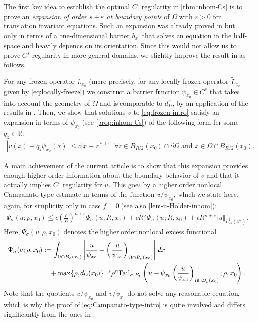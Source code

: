 \documentclass[11pt,reqno]{amsart}
\theoremstyle{plain}
\theoremstyle{definition}
\numberwithin{equation}{section}
\newcommand{\R}{\mathbb{R}}
\newcommand{\eps}{\varepsilon}
\newcommand{\1}{\mathbbm{1}}
\renewcommand{\d}{\textnormal{\,d}}
\begin{document}
The first key idea to establish the optimal $C^s$ regularity in \autoref{thm:inhom-Cs} is to prove an \textit{expansion of order $s+\eps$ at boundary points} of $\Omega$ with $\eps > 0$ for translation invariant equations.
Such an expansion was already proved in \cite{RoWe24} but only in terms of a one-dimensional barrier $b_{x_0}$ that solves an equation in the half-space and heavily depends on its orientation. Since this would not allow us to prove $C^s$ regularity in more general domains, we slightly improve the result in \cite{RoWe24} as follows.

For any frozen operator $L_{x_0}$ (more precisely, for any locally frozen operator $\widetilde{L}_{x_0}$ given by \eqref{eq:locally-freeze}) we construct a barrier function $\psi_{x_0} \in C^s$ that takes into account the geometry of $\Omega$ and is comparable to $d_{\Omega}^s$, by an application of the results in \cite{RoWe24}. Then, we show that solutions $v$ to \eqref{eq:frozen-intro} satisfy an expansion in terms of $\psi_{x_0}$ (see \autoref{prop:inhom-Cs}) of the following form for some $q_z \in \R$:
\begin{align*}
|v(x) - q_z \psi_{x_0}(x)| \le c |x-z|^{s+\eps} ~~ \forall z \in B_{R/2}(x_0) \cap \partial \Omega \text{ and } x \in \Omega \cap B_{R/2}(x_0).
\end{align*}

A main achievement of the current article is to show that this expansion provides enough higher order information about the boundary behavior of $v$ and that it actually implies $C^s$ regularity for $u$. This goes by a higher order nonlocal Campanato-type estimate in terms of the function $u/\psi_{x_0}$, which we state here, again, for simplicity only in case $f = 0$ (see also \autoref{lem-u-Holder-inhom}):
\begin{align}
\label{eq:Campanato-type-intro}
\Psi_{\sigma}(u;\rho,x_0) \leq c \left( \frac{\rho}{R} \right)^{n+\eps} \Psi_{\sigma}(u;R,x_0) + c R^{\sigma} \Phi_{\sigma}(u;R,x_0) + c R^{n + s } \Vert u \Vert_{L^1_{2s}(\R^n)}.
\end{align}
Here, $\Psi_{\sigma}(u;\rho,x_0)$ denotes the higher order nonlocal excess functional
\begin{align}\label{eq-excess-Psi}
\begin{split}
    \Psi_{\sigma}(u;\rho,x_0) &:= \int_{\Omega \cap B_{\rho}(x_0)} \left|\frac{u}{\psi_{x_0}} - \left( \frac{u}{\psi_{x_0}} \right)_{\Omega \cap B_{\rho}(x_0)} \right| \d x \\
    &\quad + \max \{ \rho,d_{\Omega}(x_0) \}^{-s} \rho^n \mathrm{Tail}_{\sigma,B_1}\left(u - \psi_{x_0} \left(\frac{u}{\psi_{x_0}} \right)_{\Omega \cap B_{\rho}(x_0)}; \rho, x_0 \right).
\end{split}
\end{align}
Note that the quotients $u/\psi_{x_0}$ and $v/\psi_{x_0}$ do not solve any reasonable equation, which is why the proof of \eqref{eq:Campanato-type-intro} is quite involved and differs significantly from the ones in \cite{KNS22}.
\end{document}

